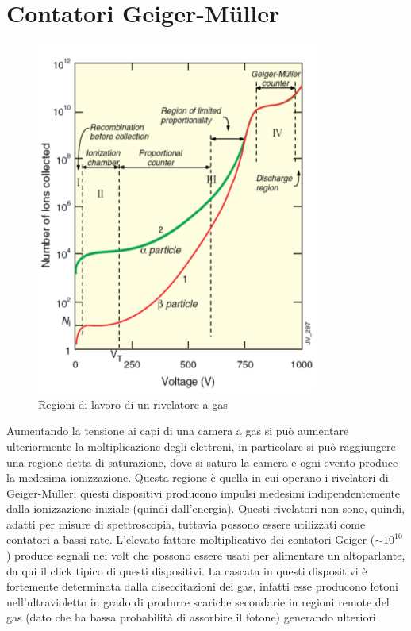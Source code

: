 \section{Contatori Geiger-M\"uller}
\begin{figure}[htbp]
\begin{center}
\includegraphics[scale=1]{./Immagini/RegioniGas.png}
\caption{Regioni di lavoro di un rivelatore a gas}
\label{fig:regioniGas}
\end{center}
\end{figure}
Aumentando la tensione ai capi di una camera a gas si pu\`o aumentare ulteriormente la moltiplicazione degli elettroni, in particolare si pu\`o raggiungere
una regione detta di saturazione, dove si satura la camera e ogni evento produce la medesima ionizzazione.
Questa regione \`e quella in cui operano i rivelatori di Geiger-M\"uller: questi dispositivi producono impulsi medesimi indipendentemente dalla ionizzazione
iniziale (quindi dall'energia).
Questi rivelatori non sono, quindi, adatti per misure di spettroscopia, tuttavia possono essere utilizzati come contatori a bassi rate.
L'elevato fattore moltiplicativo dei contatori Geiger ($\sim 10^{10}$) produce segnali nei volt che possono essere usati per alimentare un altoparlante, da qui
il click tipico di questi dispositivi.
La cascata in questi dispositivi \`e fortemente determinata dalla diseccitazioni dei gas, infatti esse producono fotoni nell'ultravioletto in grado
di produrre scariche secondarie in regioni remote del gas (dato che ha bassa probabilit\`a di assorbire il fotone) generando ulteriori
